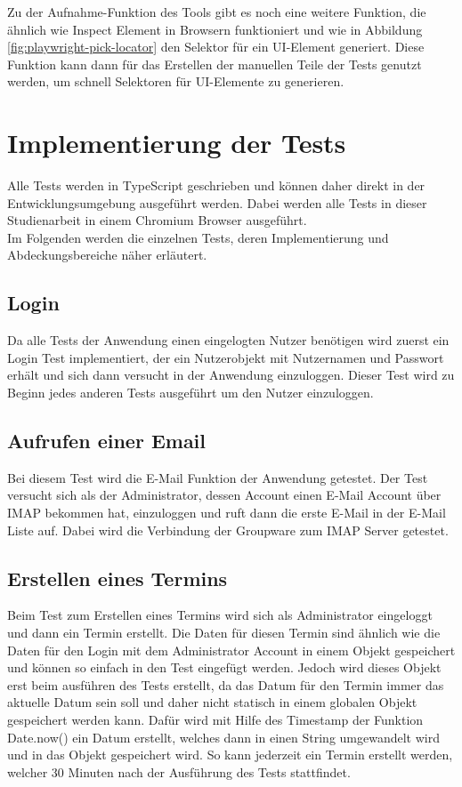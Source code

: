 Zu der Aufnahme-Funktion des Tools gibt es noch eine weitere Funktion, die ähnlich wie Inspect Element in Browsern funktioniert und wie in Abbildung \ref{fig:playwright-pick-locator} den Selektor für ein UI-Element generiert.
Diese Funktion kann dann für das Erstellen der manuellen Teile der Tests genutzt werden, um schnell Selektoren für UI-Elemente zu generieren.



\section{Implementierung der Tests}

Alle Tests werden in TypeScript geschrieben und können daher direkt in der Entwicklungsumgebung ausgeführt werden.
Dabei werden alle Tests in dieser Studienarbeit in einem Chromium Browser ausgeführt.
\\
Im Folgenden werden die einzelnen Tests, deren Implementierung und Abdeckungsbereiche näher erläutert.

\subsection{Login}

Da alle Tests der Anwendung einen eingelogten Nutzer benötigen wird zuerst ein Login Test implementiert, der ein Nutzerobjekt mit Nutzernamen und Passwort erhält und sich dann versucht in der Anwendung einzuloggen.
Dieser Test wird zu Beginn jedes anderen Tests ausgeführt um den Nutzer einzuloggen.

\subsection{Aufrufen einer Email}

Bei diesem Test wird die E-Mail Funktion der Anwendung getestet.
Der Test versucht sich als der Administrator, dessen Account einen E-Mail Account über IMAP bekommen hat, einzuloggen und ruft dann die erste E-Mail in der E-Mail Liste auf.
Dabei wird die Verbindung der Groupware zum IMAP Server getestet.

\subsection{Erstellen eines Termins}

Beim Test zum Erstellen eines Termins wird sich als Administrator eingeloggt und dann ein Termin erstellt.
Die Daten für diesen Termin sind ähnlich wie die Daten für den Login mit dem Administrator Account in einem Objekt gespeichert und können so einfach in den Test eingefügt werden.
Jedoch wird dieses Objekt erst beim ausführen des Tests erstellt, da das Datum für den Termin immer das aktuelle Datum sein soll und daher nicht statisch in einem globalen Objekt gespeichert werden kann.
Dafür wird mit  Hilfe des Timestamp der Funktion Date.now() ein Datum erstellt, welches dann in einen String umgewandelt wird und in das Objekt gespeichert wird.
So kann jederzeit ein Termin erstellt werden, welcher 30 Minuten nach der Ausführung des Tests stattfindet.

